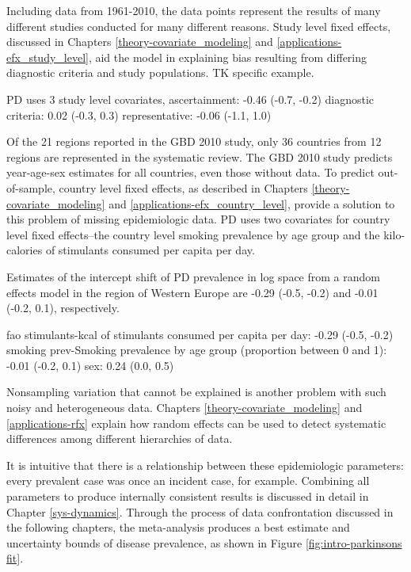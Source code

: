 Including data from 1961-2010, the data points represent the results of many different studies conducted for many different reasons.  Study level fixed effects, discussed in Chapters \ref{theory-covariate_modeling} and \ref{applications-efx_study_level}, aid the model in explaining bias resulting from differing diagnostic criteria and study populations. TK specific example.

PD uses 3 study level covariates,
ascertainment: -0.46 (-0.7, -0.2)
diagnostic criteria: 0.02 (-0.3, 0.3)
representative: -0.06 (-1.1, 1.0)

Of the 21 regions reported in the GBD 2010 study, only 36 countries from 12 regions are represented in the systematic review.  The GBD 2010 study predicts year-age-sex estimates for all countries, even those without data.  To predict out-of-sample, country level fixed effects, as described in Chapters \ref{theory-covariate_modeling} and \ref{applications-efx_country_level}, provide a solution to this problem of missing epidemiologic data.  PD uses two covariates for country level fixed effects--the country level smoking prevalence by age group and the kilo-calories of stimulants consumed per capita per day.

Estimates of the intercept shift of PD prevalence in log space from a random effects model in the region of Western Europe are -0.29 (-0.5, -0.2) and -0.01 (-0.2, 0.1), respectively.

fao stimulants-kcal of stimulants consumed per capita per day: -0.29 (-0.5, -0.2)
smoking prev-Smoking prevalence by age group (proportion between 0 and 1): -0.01 (-0.2, 0.1)
sex: 0.24 (0.0, 0.5)

Nonsampling variation that cannot be explained is another problem with such noisy and heterogeneous data.  Chapters \ref{theory-covariate_modeling} and \ref{applications-rfx} explain how random effects can be used to detect systematic differences among different hierarchies of data.

It is intuitive that there is a relationship between these epidemiologic parameters: every prevalent case was once an incident case, for example.  Combining all parameters to produce internally consistent results is discussed in detail in Chapter \ref{sys-dynamics}.  Through the process of data confrontation discussed in the following chapters, the meta-analysis produces a best estimate and uncertainty bounds of disease prevalence, as shown in Figure \ref{fig:intro-parkinsons fit}.

